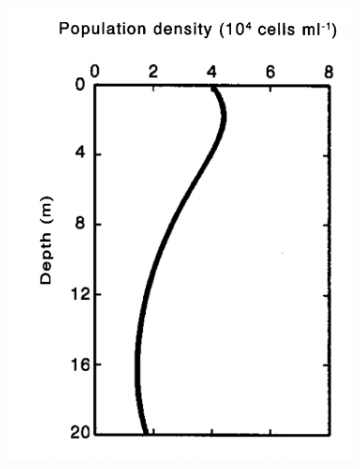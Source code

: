\begin{figure}
\begin{subfigure}[b]{0.3\textwidth}
        \includegraphics[width=\textwidth]{img/H_dep_prof_d0}
        \caption{}
        \label{fig:huism_prof_d0}
    \end{subfigure}
    \begin{subfigure}[b]{0.3\textwidth}

\end{subfigure}
\end{figure}
